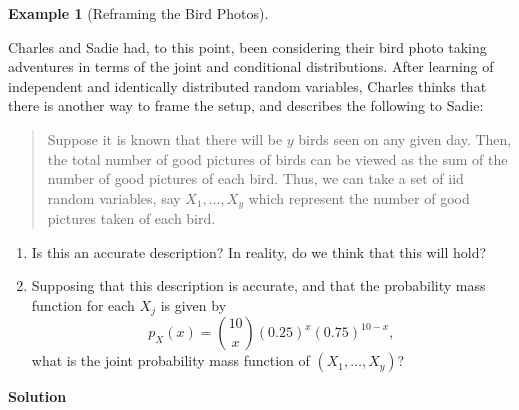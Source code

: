 \documentclass[
  letterpaper,
  DIV=11,
  numbers=noendperiod]{scrreprt}
\providecommand{\tightlist}{%
  \setlength{\itemsep}{0pt}\setlength{\parskip}{0pt}}\usepackage{longtable,booktabs,array}
\theoremstyle{definition}
\theoremstyle{definition}
\theoremstyle{definition}
\newtheorem{example}{Example}[chapter]
\theoremstyle{remark}
\begin{document}
\begin{example}[Reframing the Bird
Photos]\protect\hypertarget{exm-iid}{}\label{exm-iid}

Charles and Sadie had, to this point, been considering their bird photo
taking adventures in terms of the joint and conditional distributions.
After learning of independent and identically distributed random
variables, Charles thinks that there is another way to frame the setup,
and describes the following to Sadie:

\begin{quote}
Suppose it is known that there will be \(y\) birds seen on any given
day. Then, the total number of good pictures of birds can be viewed as
the sum of the number of good pictures of each bird. Thus, we can take a
set of iid random variables, say \(X_1,\dots,X_y\) which represent the
number of good pictures taken of each bird.
\end{quote}

\begin{enumerate}
\def\labelenumi{\alph{enumi}.}
\tightlist
\item
  Is this an accurate description? In reality, do we think that this
  will hold?
\item
  Supposing that this description is accurate, and that the probability
  mass function for each \(X_j\) is given by
  \[p_X(x) = \binom{10}{x}(0.25)^{x}(0.75)^{10-x},\] what is the joint
  probability mass function of \((X_1,\dots,X_y)\)?
\end{enumerate}

\begin{tcolorbox}[enhanced jigsaw, colback=white, breakable, rightrule=.15mm, leftrule=.75mm, toprule=.15mm, left=2mm, arc=.35mm, opacityback=0, bottomrule=.15mm]

\vspace{-3mm}\textbf{Solution}\vspace{3mm}


\end{tcolorbox}
\end{example}
\end{document}
